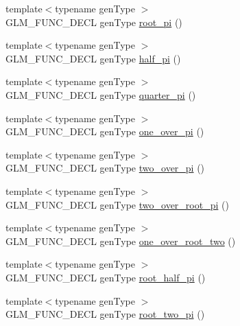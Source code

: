 \begin{DoxyCompactItemize}
\item 
{\footnotesize template$<$typename gen\-Type $>$ }\\G\-L\-M\-\_\-\-F\-U\-N\-C\-\_\-\-D\-E\-C\-L gen\-Type \hyperlink{group__gtc__constants_ga1cfeb345f34f72697d14f4db8d5d4c6c}{root\-\_\-pi} ()
\item 
{\footnotesize template$<$typename gen\-Type $>$ }\\G\-L\-M\-\_\-\-F\-U\-N\-C\-\_\-\-D\-E\-C\-L gen\-Type \hyperlink{group__gtc__constants_ga7f7a1050729f3b03b1873a06ba4a472f}{half\-\_\-pi} ()
\item 
{\footnotesize template$<$typename gen\-Type $>$ }\\G\-L\-M\-\_\-\-F\-U\-N\-C\-\_\-\-D\-E\-C\-L gen\-Type \hyperlink{group__gtc__constants_ga0148d757b4bfda4d86251b8d1ea1dad3}{quarter\-\_\-pi} ()
\item 
{\footnotesize template$<$typename gen\-Type $>$ }\\G\-L\-M\-\_\-\-F\-U\-N\-C\-\_\-\-D\-E\-C\-L gen\-Type \hyperlink{group__gtc__constants_ga9ba09a027db6d4f4e259b01cf5d6c178}{one\-\_\-over\-\_\-pi} ()
\item 
{\footnotesize template$<$typename gen\-Type $>$ }\\G\-L\-M\-\_\-\-F\-U\-N\-C\-\_\-\-D\-E\-C\-L gen\-Type \hyperlink{group__gtc__constants_ga85729d38c47351686e8659f80447a7ea}{two\-\_\-over\-\_\-pi} ()
\item 
{\footnotesize template$<$typename gen\-Type $>$ }\\G\-L\-M\-\_\-\-F\-U\-N\-C\-\_\-\-D\-E\-C\-L gen\-Type \hyperlink{group__gtc__constants_ga767e539c20585bf60aa63595b0f0b259}{two\-\_\-over\-\_\-root\-\_\-pi} ()
\item 
{\footnotesize template$<$typename gen\-Type $>$ }\\G\-L\-M\-\_\-\-F\-U\-N\-C\-\_\-\-D\-E\-C\-L gen\-Type \hyperlink{group__gtc__constants_gac1a9b3248357fd9e9b740bed90e0b1b7}{one\-\_\-over\-\_\-root\-\_\-two} ()
\item 
{\footnotesize template$<$typename gen\-Type $>$ }\\G\-L\-M\-\_\-\-F\-U\-N\-C\-\_\-\-D\-E\-C\-L gen\-Type \hyperlink{group__gtc__constants_gaec5af85e2148c118aad7e797430fdeb0}{root\-\_\-half\-\_\-pi} ()
\item 
{\footnotesize template$<$typename gen\-Type $>$ }\\G\-L\-M\-\_\-\-F\-U\-N\-C\-\_\-\-D\-E\-C\-L gen\-Type \hyperlink{group__gtc__constants_gae991b4d39c57b57990054eec3677597c}{root\-\_\-two\-\_\-pi} ()
\item 

\end{DoxyCompactItemize}
